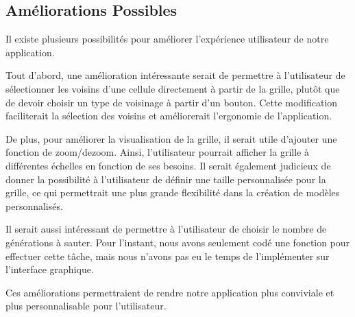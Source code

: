 \subsection{Améliorations Possibles}

Il existe plusieurs possibilités pour améliorer l'expérience utilisateur de notre application.

Tout d'abord, une amélioration intéressante serait de permettre à l'utilisateur de sélectionner les voisins d'une cellule directement à partir de la grille, plutôt que de devoir choisir un type de voisinage à partir d'un bouton. Cette modification faciliterait la sélection des voisins et améliorerait l'ergonomie de l'application.

De plus, pour améliorer la visualisation de la grille, il serait utile d'ajouter une fonction de zoom/dezoom. Ainsi, l'utilisateur pourrait afficher la grille à différentes échelles en fonction de ses besoins. Il serait également judicieux de donner la possibilité à l'utilisateur de définir une taille personnalisée pour la grille, ce qui permettrait une plus grande flexibilité dans la création de modèles personnalisés.

Il serait aussi intéressant de permettre à l'utilisateur de choisir le nombre de générations à sauter. Pour l'instant, nous avons seulement codé une fonction pour effectuer cette tâche, mais nous n'avons pas eu le temps de l'implémenter sur l'interface graphique.

Ces améliorations permettraient de rendre notre application plus conviviale et plus personnalisable pour l'utilisateur.


